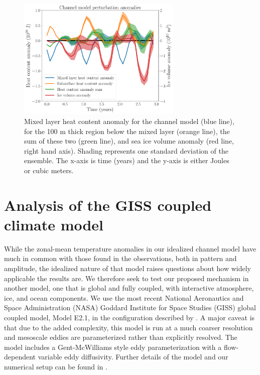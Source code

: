 \documentclass{ametsocV5}
\begin{document}
\begin{figure}[!ht]
    \begin{center}
        \includegraphics[width=0.7\textwidth]{figures/channel_model_OHC_and_ice_anoms.pdf}
        \caption{Mixed layer heat content anomaly for the channel model (blue line), for the 100 m thick region below the mixed layer (orange line), the sum of these two (green line), and sea ice volume anomaly (red line, right hand axis). Shading represents one standard deviation of the ensemble. The x-axis is time (years) and the y-axis is either Joules or cubic meters.}
        \label{fig:channel_model_OHC_and_ice_anoms}
    \end{center}
\end{figure}



\section{Analysis of the GISS coupled climate model} %
\label{sec:analysis_of_a_global_coupled_model}

While the zonal-mean temperature anomalies in our idealized channel model have much in common with those found in the observations, both in pattern and amplitude, the idealized nature of that model raises questions about how widely applicable the results are. We therefore seek to test our proposed mechanism in another model, one that is global and fully coupled, with interactive atmosphere, ice, and ocean components. We use the most recent National Aeronautics and Space Administration (NASA) Goddard Institute for Space Studies (GISS) global coupled model, Model E2.1, in the configuration described by \citet{Doddridge2019a}. A major caveat is that due to the added complexity, this model is run at a much coarser resolution and mesoscale eddies are parameterized rather than explicitly resolved. The model includes a Gent-McWilliams style eddy parameterization \citep{Gent1990,Gent1995} with a flow-dependent variable eddy diffusivity. Further details of the model and our numerical setup can be found in \citet{Doddridge2019a}.
\end{document}
